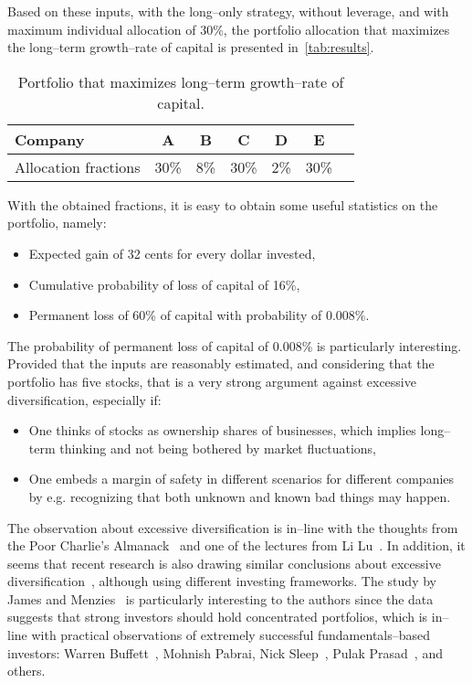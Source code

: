 \documentclass{article}
\begin{document}
\indent Based on these inputs, with the long--only strategy, without leverage,
and with maximum individual allocation of 30\%, the portfolio allocation that
maximizes the long--term growth--rate of capital is presented
in~\autoref{tab:results}.

\begin{table}
\caption{Portfolio that maximizes long--term growth--rate of capital.}
\vspace{0.25cm}
\centering
\begin{tabular}{l|c|c|c|c|c|c}
Company & A & B & C & D & E \\
\hline
Allocation fractions & 30\% & 8\% & 30\% & 2\% & 30\% \\
\end{tabular}%
\label{tab:results}%
\end{table}%

With the obtained fractions, it is easy to obtain some useful
statistics on the portfolio, namely:
\begin{itemize}
    \item Expected gain of 32 cents for every dollar invested,
    \item Cumulative probability of loss of capital of 16\%,
    \item Permanent loss of 60\% of capital with probability of 0.008\%.
\end{itemize}

\noindent The probability of permanent loss of capital of 0.008\% is
particularly interesting. Provided that the inputs are reasonably estimated, and
considering that the portfolio has five stocks, that is a very strong argument
against excessive diversification, especially if:
\begin{itemize}
    \item One thinks of stocks as ownership shares of businesses, which implies
    long--term thinking and not being bothered by market fluctuations, 
    \item One embeds a margin of safety in different scenarios for different
    companies by e.g. recognizing that both unknown and known bad things may
    happen.
\end{itemize}

\noindent The observation about excessive diversification is in--line with the
thoughts from the Poor Charlie's Almanack~\cite{almanack} and one of the
lectures from Li Lu~\cite{liLuLecture}. In addition, it seems that recent
research is also drawing similar conclusions about excessive
diversification~\cite{jamesMenzies,arvanitisEtAl}, although using different
investing frameworks. The study by James and Menzies~\cite{jamesMenzies} is
particularly interesting to the authors since the data suggests that strong
investors should hold concentrated portfolios, which is in--line with practical
observations of extremely successful fundamentals--based investors: Warren
Buffett~\cite{berkshireLetters}, Mohnish Pabrai, Nick Sleep~\cite{nomadLetters},
Pulak Prasad~\cite{darwinInvesting}, and others.
\end{document}

